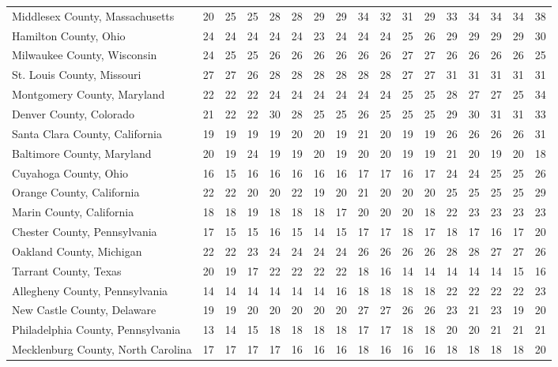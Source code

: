 \begin{landscape}
\begin{longtable}{lcccccccccccccccc}
	Middlesex County, Massachusetts & 20 & 25 & 25 & 28 & 28 & 29 & 29 & 34 & 32 & 31 & 29 & 33 & 34 & 34 & 34 & 38 \\
	Hamilton County, Ohio & 24 & 24 & 24 & 24 & 24 & 23 & 24 & 24 & 24 & 25 & 26 & 29 & 29 & 29 & 29 & 30 \\
	Milwaukee County, Wisconsin & 24 & 25 & 25 & 26 & 26 & 26 & 26 & 26 & 26 & 27 & 27 & 26 & 26 & 26 & 26 & 25 \\
	St. Louis County, Missouri & 27 & 27 & 26 & 28 & 28 & 28 & 28 & 28 & 28 & 27 & 27 & 31 & 31 & 31 & 31 & 31 \\
	Montgomery County, Maryland & 22 & 22 & 22 & 24 & 24 & 24 & 24 & 24 & 24 & 25 & 25 & 28 & 27 & 27 & 25 & 34 \\
	Denver County, Colorado & 21 & 22 & 22 & 30 & 28 & 25 & 25 & 26 & 25 & 25 & 25 & 29 & 30 & 31 & 31 & 33 \\
	Santa Clara County, California & 19 & 19 & 19 & 19 & 20 & 20 & 19 & 21 & 20 & 19 & 19 & 26 & 26 & 26 & 26 & 31 \\
	Baltimore County, Maryland & 20 & 19 & 24 & 19 & 19 & 20 & 19 & 20 & 20 & 19 & 19 & 21 & 20 & 19 & 20 & 18 \\
	Cuyahoga County, Ohio & 16 & 15 & 16 & 16 & 16 & 16 & 16 & 17 & 17 & 16 & 17 & 24 & 24 & 25 & 25 & 26 \\
	Orange County, California & 22 & 22 & 20 & 20 & 22 & 19 & 20 & 21 & 20 & 20 & 20 & 25 & 25 & 25 & 25 & 29 \\
	Marin County, California & 18 & 18 & 19 & 18 & 18 & 18 & 17 & 20 & 20 & 20 & 18 & 22 & 23 & 23 & 23 & 23 \\
	Chester County, Pennsylvania & 17 & 15 & 15 & 16 & 15 & 14 & 15 & 17 & 17 & 18 & 17 & 18 & 17 & 16 & 17 & 20 \\
	Oakland County, Michigan & 22 & 22 & 23 & 24 & 24 & 24 & 24 & 26 & 26 & 26 & 26 & 28 & 28 & 27 & 27 & 26 \\
	Tarrant County, Texas & 20 & 19 & 17 & 22 & 22 & 22 & 22 & 18 & 16 & 14 & 14 & 14 & 14 & 14 & 15 & 16 \\
	Allegheny County, Pennsylvania & 14 & 14 & 14 & 14 & 14 & 14 & 16 & 18 & 18 & 18 & 18 & 22 & 22 & 22 & 22 & 23 \\
	New Castle County, Delaware & 19 & 19 & 20 & 20 & 20 & 20 & 20 & 27 & 27 & 26 & 26 & 23 & 21 & 23 & 19 & 20 \\
	Philadelphia County, Pennsylvania & 13 & 14 & 15 & 18 & 18 & 18 & 18 & 17 & 17 & 18 & 18 & 20 & 20 & 21 & 21 & 21 \\
	Mecklenburg County, North Carolina & 17 & 17 & 17 & 17 & 16 & 16 & 16 & 18 & 16 & 16 & 16 & 18 & 18 & 18 & 18 & 20 \\

\end{longtable}
\end{landscape}
